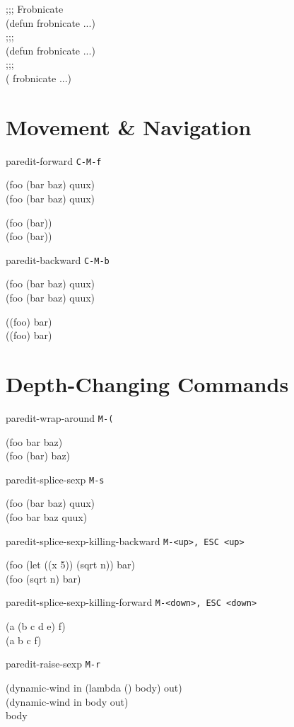 \documentclass[8pt,landscape,a4paper]{article}
\begin{document}
\begin{multicols}{4}
{;;;\cursor{} Frobnicate\\
(defun frobnicate ...)\\
;;;\cursor\\
(defun frobnicate ...)\\
;;;\\
(\cursor{} frobnicate ...)
}

    \section*{Movement \& Navigation}

paredit-forward \texttt{C-M-f}

{\ttfamily
(foo \cursor(bar baz) quux)\\
(foo (bar baz)\cursor{} quux)

(foo (bar)\cursor)\\
(foo (bar))\cursor
}

paredit-backward \texttt{C-M-b}

{\ttfamily
(foo (bar baz)\cursor{} quux)\\
(foo \cursor(bar baz) quux)

(\cursor(foo) bar)\\
\cursor((foo) bar)
}

    \section*{Depth-Changing Commands}

paredit-wrap-around \texttt{M-(}

{\ttfamily
(foo \cursor bar baz)\\
(foo (\cursor bar) baz)
}

paredit-splice-sexp \texttt{M-s}

{\ttfamily
(foo (bar\cursor{} baz) quux)\\
(foo bar\cursor{} baz quux)
}

paredit-splice-sexp-killing-backward \texttt{M-<up>, ESC <up>}

{\ttfamily
(foo (let ((x 5)) \cursor(sqrt n)) bar)\\
(foo \cursor(sqrt n) bar)
}

paredit-splice-sexp-killing-forward \texttt{M-<down>, ESC <down>}

{\ttfamily
(a (b c\cursor{} d e) f)\\
(a b c\cursor{} f)
}

paredit-raise-sexp \texttt{M-r}

{\ttfamily
(dynamic-wind in (lambda () \cursor body) out)\\
(dynamic-wind in \cursor body out)\\
\cursor body
}


\end{multicols}
\end{document}
